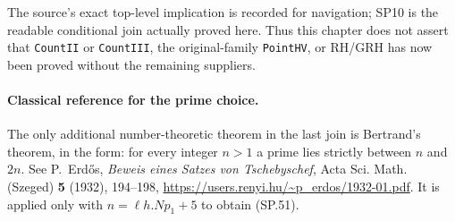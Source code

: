 The source's exact top-level implication is recorded for navigation;
SP10 is the readable conditional join actually proved here.  Thus
this chapter does not assert that \texttt{CountII} or
\texttt{CountIII}, the original-family \texttt{PointHV}, or RH/GRH
has now been proved without the remaining suppliers.

\paragraph{Classical reference for the prime choice.}
The only additional number-theoretic theorem in the last join is
Bertrand's theorem, in the form: for every integer $n>1$ a prime
lies strictly between $n$ and $2n$.  See P.~Erd\H{o}s,
\emph{Beweis eines Satzes von Tschebyschef}, Acta Sci. Math.
(Szeged) \textbf{5} (1932), 194--198,
\url{https://users.renyi.hu/~p_erdos/1932-01.pdf}.
It is applied only with $n=\ell h.Np_1+5$ to obtain (SP.51).

